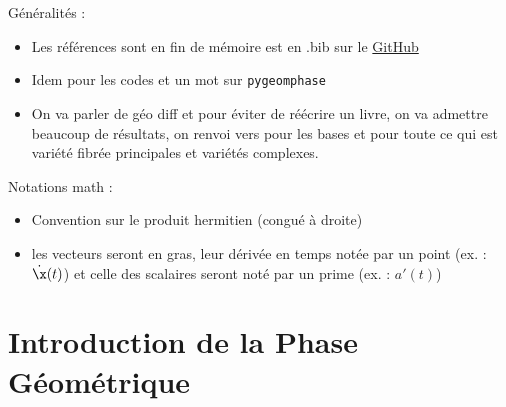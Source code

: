 \\ \\
Généralités :
\begin{itemize}
	
	\item Les références sont en fin de mémoire est en .bib sur le \href{https://github.com/GregoireDoat/StageM2}{GitHub}
	
	\item Idem pour les codes et un mot sur \texttt{pygeomphase}

	\item On va parler de géo diff et pour éviter de réécrire un livre, on va admettre beaucoup de résultats, on renvoi vers \cite{lafontaine_introduction_2015,do_carmo_riemannian_1992} pour les bases et  \cite{nakahara_geometry_2003,pham_mau_quan_introduction_1969,ballmann_lectures_2006} pour toute ce qui est variété fibrée principales et variétés complexes.
	
\end{itemize}
\skipl

Notations math :
\begin{itemize}
	
	\item Convention sur le produit hermitien (congué à droite)
	
	\item les vecteurs seront en gras, leur dérivée en temps notée par un point (ex. : $\dot{\x}(t)$) et celle des scalaires seront noté par un prime (ex. : $a'(t)$)
	
\end{itemize}
\skipl



\newpage








\part{Introduction de la Phase Géométrique} \label{part:param_instant} 


